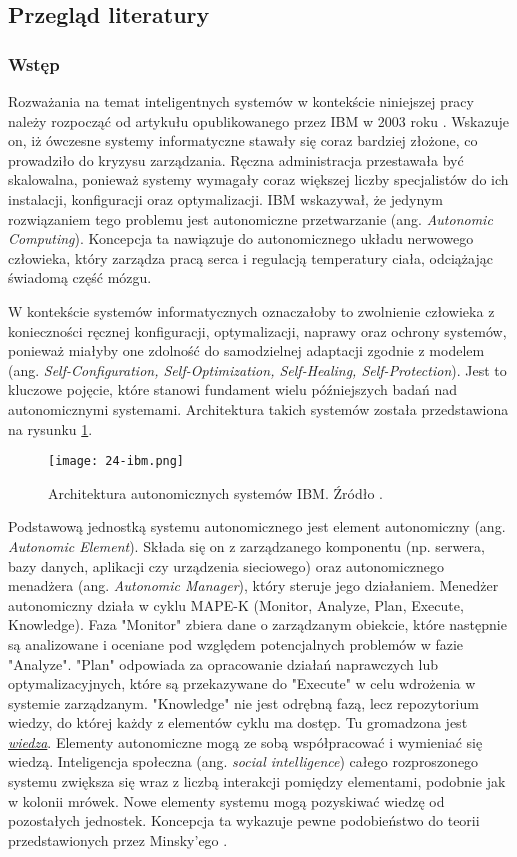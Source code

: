 \subsection{Przegląd literatury}
\subsubsection{Wstęp}
Rozważania na temat inteligentnych systemów w kontekście niniejszej pracy należy rozpocząć od artykułu opublikowanego przez IBM w 2003 roku \cite{kephart2003}. Wskazuje on, iż ówczesne systemy informatyczne stawały się coraz bardziej złożone, co prowadziło do kryzysu zarządzania. Ręczna administracja przestawała być skalowalna, ponieważ systemy wymagały coraz większej liczby specjalistów do ich instalacji, konfiguracji oraz optymalizacji. IBM wskazywał, że jedynym rozwiązaniem tego problemu jest autonomiczne przetwarzanie (ang. \textit{Autonomic Computing}). Koncepcja ta nawiązuje do autonomicznego układu nerwowego człowieka, który zarządza pracą serca i regulacją temperatury ciała, odciążając świadomą część mózgu.

W kontekście systemów informatycznych oznaczałoby to zwolnienie człowieka z konieczności ręcznej konfiguracji, optymalizacji, naprawy oraz ochrony systemów, ponieważ miałyby one zdolność do samodzielnej adaptacji zgodnie z modelem (ang. \textit{Self-Configuration, Self-Optimization, Self-Healing, Self-Protection}). Jest to kluczowe pojęcie, które stanowi fundament wielu późniejszych badań nad autonomicznymi systemami. Architektura takich systemów została przedstawiona na rysunku \ref{fig:24-ibm}.

\begin{figure}[!htbp]
    \centering \texttt{[image: 24-ibm.png]}
    \caption{Architektura autonomicznych systemów IBM. Źródło \cite{kephart2003}.}\label{fig:24-ibm}
\end{figure}

Podstawową jednostką systemu autonomicznego jest element autonomiczny (ang. \textit{Autonomic Element}). Składa się on z zarządzanego komponentu (np. serwera, bazy danych, aplikacji czy urządzenia sieciowego) oraz autonomicznego menadżera (ang. \textit{Autonomic Manager}), który steruje jego działaniem. Menedżer autonomiczny działa w cyklu MAPE-K (Monitor, Analyze, Plan, Execute, Knowledge). Faza "Monitor" zbiera dane o zarządzanym obiekcie, które następnie są analizowane i oceniane pod względem potencjalnych problemów w fazie "Analyze". "Plan" odpowiada za opracowanie działań naprawczych lub optymalizacyjnych, które są przekazywane do "Execute" w celu wdrożenia w systemie zarządzanym. "Knowledge" nie jest odrębną fazą, lecz repozytorium wiedzy, do której każdy z elementów cyklu ma dostęp. Tu gromadzona jest \hyperlink{def:wiedza}{\textit{wiedza}}. Elementy autonomiczne mogą ze sobą współpracować i wymieniać się wiedzą. Inteligencja społeczna (ang. \textit{social intelligence}) całego rozproszonego systemu zwiększa się wraz z liczbą interakcji pomiędzy elementami, podobnie jak w kolonii mrówek. Nowe elementy systemu mogą pozyskiwać wiedzę od pozostałych jednostek. Koncepcja ta wykazuje pewne podobieństwo do teorii przedstawionych przez Minsky'ego \cite{minsky1986}.

